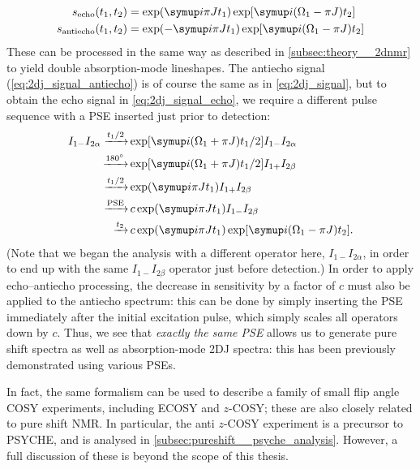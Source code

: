 \begin{align}
    s_\text{echo}(t_1, t_2) &= \exp(\mi\pi J t_1) \exp[\mi(\Omega_1 - \pi J) t_2] \label{eq:2dj_signal_echo} \\
    s_\text{antiecho}(t_1, t_2) &= \exp(-\mi\pi J t_1) \exp[\mi(\Omega_1 - \pi J) t_2] \label{eq:2dj_signal_antiecho}
\end{align}
These can be processed in the same way as described in \cref{subsec:theory__2dnmr} to yield double absorption-mode lineshapes.
The antiecho signal (\cref{eq:2dj_signal_antiecho}) is of course the same as in \cref{eq:2dj_signal}, but to obtain the echo signal in \cref{eq:2dj_signal_echo}, we require a different pulse sequence with a PSE inserted just prior to detection:
\begin{align}
    \label{eq:2dj_signal_echo_ctp}
    I_{1-}I_{2\alpha} \xrightarrow[]{t_1/2} &\exp[\mi(\Omega_1 + \pi J)t_1/2] I_{1-}I_{2\alpha} \\
    \xrightarrow[]{\ang{180}} &\exp[\mi(\Omega_1 + \pi J)t_1/2] I_{1+}I_{2\beta} \\
    \xrightarrow[]{t_1/2} &\exp(\mi \pi J t_1) I_{1+}I_{2\beta} \\
    \xrightarrow[]{\text{PSE}} &\,c \exp(\mi \pi J t_1) I_{1-}I_{2\beta} \\
    \xrightarrow[]{t_2} &\,c \exp(\mi \pi J t_1) \exp[\mi(\Omega_1 - \pi J) t_2].
\end{align}
(Note that we began the analysis with a different operator here, $I_{1-}I_{2\alpha}$, in order to end up with the same $I_{1-}I_{2\beta}$ operator just before detection.)
In order to apply echo--antiecho processing, the decrease in sensitivity by a factor of $c$ must also be applied to the antiecho spectrum: this can be done by simply inserting the PSE immediately after the initial excitation pulse, which simply scales all operators down by $c$.
Thus, we see that \textit{exactly the same PSE} allows us to generate pure shift spectra as well as absorption-mode 2DJ spectra: this has been previously demonstrated using various PSEs.\autocite{Pell2007JMR,Foroozandeh2015CC}

In fact, the same formalism can be used to describe a family of small flip angle COSY experiments, including ECOSY\autocite{Griesinger1985JACS,Sorensen1985JACS,Griesinger1986JCP} and $z$-COSY\autocite{Oschkinat1986JMR,Pell2007MRC,Moutzouri2020ACIE}; these are also closely related to pure shift NMR.
In particular, the anti $z$-COSY experiment is a precursor to PSYCHE, and is analysed in \cref{subsec:pureshift__psyche_analysis}.
However, a full discussion of these is beyond the scope of this thesis.
